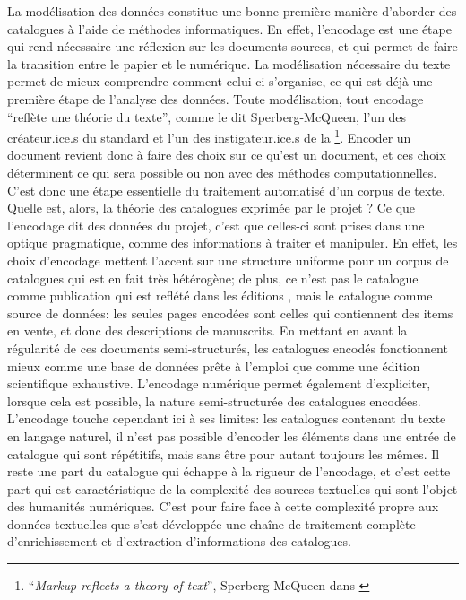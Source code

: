La modélisation des données constitue une bonne première manière d'aborder des catalogues à l'aide de méthodes informatiques. En effet, l'encodage est une étape qui rend nécessaire une réflexion sur les documents sources, et qui permet de faire la transition entre le papier et le numérique. La modélisation nécessaire du texte permet de mieux comprendre comment celui-ci s'organise, ce qui est déjà une première étape de l'analyse des données. Toute modélisation, tout encodage \enquote{reflète une théorie du texte}, comme le dit Sperberg-McQueen, l'un des créateur.ice.s du standard \xml{} et l'un des instigateur.ice.s de la \tei{}\footnote{\enquote{\textit{Markup reflects a theory of text}}, Sperberg-McQueen dans \cite{renear_refining_1996}}. Encoder un document revient donc à faire des choix sur ce qu'est un document, et ces choix déterminent ce qui sera possible ou non avec des méthodes computationnelles. C'est donc une étape essentielle du traitement automatisé d'un corpus de texte. Quelle est, alors, la théorie des catalogues exprimée par le projet \mssktb{}? Ce que l'encodage dit des données du projet, c'est que celles-ci sont prises dans une optique pragmatique, comme des informations à traiter et manipuler. En effet, les choix d'encodage mettent l'accent sur une structure uniforme pour un corpus de catalogues qui est en fait très hétérogène; de plus, ce n'est pas le catalogue comme publication qui est reflété dans les éditions \xmltei{}, mais le catalogue comme source de données: les seules pages encodées sont celles qui contiennent des items en vente, et donc des descriptions de manuscrits. En mettant en avant la régularité de ces documents semi-structurés, les catalogues encodés fonctionnent mieux comme une base de données prête à l'emploi que comme une édition scientifique exhaustive. L'encodage numérique permet également d'expliciter, lorsque cela est possible, la nature semi-structurée des catalogues encodées. L'encodage touche cependant ici à ses limites: les catalogues contenant du texte en langage naturel, il n'est pas possible d'encoder les éléments dans une entrée de catalogue qui sont répétitifs, mais sans être pour autant toujours les mêmes. Il reste une part du catalogue qui échappe à la rigueur de l'encodage, et c'est cette part qui est caractéristique de la complexité des sources textuelles qui sont l'objet des humanités numériques. C'est pour faire face à cette complexité propre aux données textuelles que s'est développée une chaîne de traitement complète d'enrichissement et d'extraction d'informations des catalogues.

